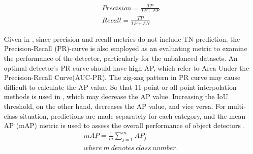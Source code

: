 \documentclass[10pt,twocolumn,letterpaper]{article}  %
\begin{document}
\begin{equation}
	\label{eq:PR_metrics}
\begin{aligned}
	&Precision = \frac{TP}{TP+FP} \\
	&Recall = \frac{TP}{TP+FN}
\end{aligned}
\end{equation}


Given in \cite{du2018unmanned}, since precision and recall metrics do not include TN prediction, the Precision-Recall (PR)-curve is also employed as an evaluating metric to examine the performance of the detector, particularly for the unbalanced datasets. An optimal detector's PR curve should have high AP, which refer to  Area Under the Precision-Recall Curve(AUC-PR). The zig-zag pattern in PR curve may cause difficult to calculate the AP value. So that 11-point or all-point interpolation methods is used in \cite{everingham2015pascal}, which may decrease the AP value. Increasing the IoU threshold, on the other hand, decreases the AP value, and vice versa. For multi-class situation, predictions are made separately for each category, and the mean AP (mAP) metric is used to assess the overall performance of object detectors \cite{bisio2022systematic}.
\begin{equation}
	\label{eq:mAP_metrics}
\begin{aligned}
	&mAP = \frac{1}{m} \sum_{j=1}^{m} AP_j \\
	&where~m~denotes~class~number.
\end{aligned}
\end{equation}
\end{document}
